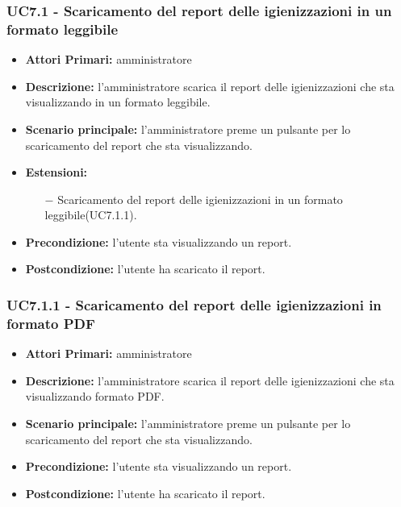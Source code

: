 \subsubsection{ UC7.1 - Scaricamento del report delle igienizzazioni in un formato leggibile}
\begin{itemize}
	\item\textbf{Attori Primari:} 
	amministratore
	\item\textbf{Descrizione:} 
	l'amministratore scarica il report delle igienizzazioni che sta visualizzando in un formato leggibile.
	\item\textbf{Scenario principale:} 
	l'amministratore preme un pulsante per lo scaricamento del report che sta visualizzando.
	\item\textbf{Estensioni:}
	\begin{itemize}
		\item[$-$] Scaricamento del report delle igienizzazioni in un formato leggibile(UC7.1.1).
	\end{itemize}
	\item\textbf{Precondizione:} 
	l'utente sta visualizzando un report.
	\item\textbf{Postcondizione:}
	l'utente ha scaricato il report.
\end{itemize}

\subsubsection{ UC7.1.1 - Scaricamento del report delle igienizzazioni in formato PDF}
\begin{itemize}
	\item\textbf{Attori Primari:} 
	amministratore
	\item\textbf{Descrizione:} 
	l'amministratore scarica il report delle igienizzazioni che sta visualizzando formato PDF.
	\item\textbf{Scenario principale:} 
	l'amministratore preme un pulsante per lo scaricamento del report che sta visualizzando.
	\item\textbf{Precondizione:} 
	l'utente sta visualizzando un report.
	\item\textbf{Postcondizione:}
	l'utente ha scaricato il report.
\end{itemize}


